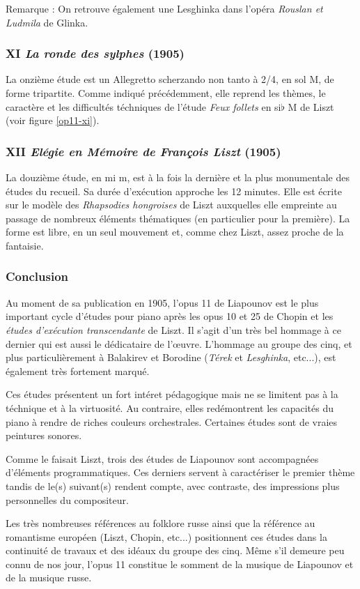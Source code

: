 Remarque : On retrouve également une Lesghinka dans l'opéra \emph{Rouslan et Ludmila} de Glinka.

\newpage

\subsubsection{XI \emph{La ronde des sylphes} (1905)}

La onzième étude est un Allegretto scherzando non tanto à 2/4, en sol M, de forme tripartite. Comme indiqué précédemment, elle reprend les thèmes, le caractère et les difficultés téchniques de l'étude \emph{Feux follets} en si$\flat$ M de Liszt (voir figure \ref{op11-xi}).

\subsubsection{XII \emph{Elégie en Mémoire de François Liszt} (1905)}

La douzième étude, en mi m, est à la fois la dernière et la plus monumentale des études du recueil. Sa durée d'exécution approche les 12 minutes. Elle est écrite sur le modèle des \emph{Rhapsodies hongroises} de Liszt auxquelles elle empreinte au passage de nombreux éléments thématiques (en particulier pour la première). La forme est libre, en un seul mouvement et, comme chez Liszt, assez proche de la fantaisie.

\subsubsection{Conclusion}

Au moment de sa publication en 1905, l'opus 11 de Liapounov est le plus important cycle d'études pour piano après les opus 10 et 25 de Chopin et les \emph{études d'exécution transcendante} de Liszt. Il s'agit d'un très bel hommage à ce dernier qui est aussi le dédicataire de l'œuvre. L'hommage au groupe des cinq, et plus particulièrement à Balakirev et Borodine (\emph{Térek} et \emph{Lesghinka}, etc...), est également très fortement marqué.

Ces études présentent un fort intéret pédagogique mais ne se limitent pas à la téchnique et à la virtuosité. Au contraire, elles redémontrent les capacités du piano à rendre de riches couleurs orchestrales. Certaines études sont de vraies peintures sonores.

Comme le faisait Liszt, trois des études de Liapounov sont accompagnées d'éléments programmatiques. Ces derniers servent à caractériser le premier thème tandis de le(s) suivant(s) rendent compte, avec contraste, des impressions plus personnelles du compositeur.

Les très nombreuses références au folklore russe ainsi que la référence au romantisme européen (Liszt, Chopin, etc...) positionnent ces études dans la continuité de travaux et des idéaux du groupe des cinq. Même s'il demeure peu connu de nos jour, l'opus 11 constitue le somment de la musique de Liapounov et de la musique russe.

